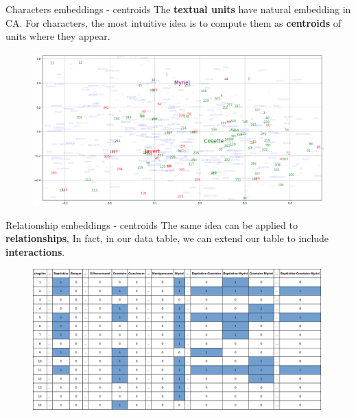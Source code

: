\documentclass[10pt]{beamer}
\newcommand{\imp}[1]{\textbf{\color{cyan}#1}}
\begin{document}
	
	\begin{frame}{Characters embeddings - centroids}
		The \imp{textual units} have natural embedding in CA. For characters, the most intuitive idea is to compute them as \imp{centroids} of units where they appear.
		\begin{figure}
			\centering
			\includegraphics[width=\textwidth]{img/char_embeddings.png}
		\end{figure}
	\end{frame}
	
	
	\begin{frame}{Relationship embeddings - centroids}
		The same idea can be applied to \imp{relationships}, In fact, in our data table, we can extend our table to include \imp{interactions}.
		\begin{figure}
			\centering
			\includegraphics[width=\textwidth]{img/occurences_data.png}
		\end{figure}
	\end{frame}
	
	
\end{document}
